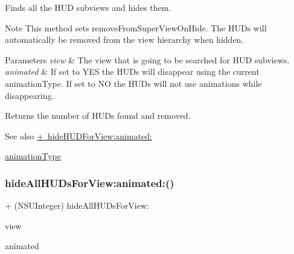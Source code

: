 Finds all the H\+UD subviews and hides them.

\begin{DoxyNote}{Note}
This method sets {\ttfamily remove\+From\+Super\+View\+On\+Hide}. The H\+U\+Ds will automatically be removed from the view hierarchy when hidden.
\end{DoxyNote}

\begin{DoxyParams}{Parameters}
{\em view} & The view that is going to be searched for H\+UD subviews. \\
\hline
{\em animated} & If set to Y\+ES the H\+U\+Ds will disappear using the current animation\+Type. If set to NO the H\+U\+Ds will not use animations while disappearing. \\
\hline
\end{DoxyParams}
\begin{DoxyReturn}{Returns}
the number of H\+U\+Ds found and removed.
\end{DoxyReturn}
\begin{DoxySeeAlso}{See also}
\mbox{\hyperlink{interface_m_b_progress_h_u_d_a7b0826c34eea1a15d62aabd00c249666}{+ hide\+H\+U\+D\+For\+View\+:animated\+:}} 

\mbox{\hyperlink{interface_m_b_progress_h_u_d_a71d04bb9e2839df9377ad10d03b2e468}{animation\+Type}} 
\end{DoxySeeAlso}
\mbox{\label{interface_m_b_progress_h_u_d_a24782426046cf6dda1534c2d27750454}} 
\subsubsection{\texorpdfstring{hide\+All\+H\+U\+Ds\+For\+View\+:animated\+:()}{hideAllHUDsForView:animated:()}\hspace{0.1cm}{\footnotesize\ttfamily [3/3]}}
{\footnotesize\ttfamily + (N\+S\+U\+Integer) hide\+All\+H\+U\+Ds\+For\+View\+: \begin{DoxyParamCaption}\item[{(U\+I\+View $\ast$)}]{view }\item[{animated:(B\+O\+OL)}]{animated }\end{DoxyParamCaption}}

